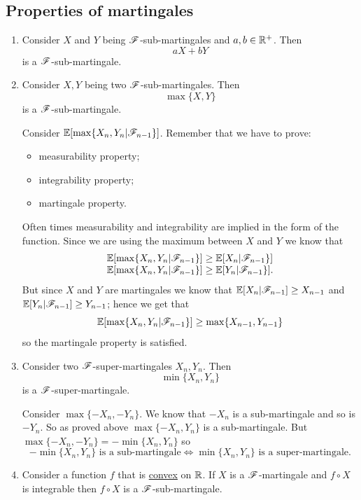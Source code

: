 \documentclass{report}
\begin{document}
\subsection{Properties of martingales}
\begin{enumerate}
	\item Consider $X$ and $Y$ being $\mathscr{F}$-sub-martingales and $a,b\in\mathbb{R}^{+}$. Then 
	\[aX+bY\]
	is a $\mathscr{F}$-sub-martingale.
	\item Consider $X,Y$ being two $\mathscr{F}$-sub-martingales. Then
	\[\max\{X,Y\}\]
	is a $\mathscr{F}$-sub-martingale.
	\begin{fancyproof}
		Consider $\mathbb{E}[\max\{X_{n},Y_{n}|\mathscr{F}_{n-1}\}]$. Remember that we have to prove: \begin{itemize}
			\item measurability property;
			\item integrability property;
			\item martingale property.
		\end{itemize}
		Often times measurability and integrability are implied in the form of the function.  Since we are using the maximum between $X$ and $Y$ we know that
		\[\begin{array}{l}
			\mathbb{E}[\max\{X_{n},Y_{n}|\mathscr{F}_{n-1}\}]\geq\mathbb{E}[X_{n}|\mathscr{F}_{n-1}\}]\\
			\mathbb{E}[\max\{X_{n},Y_{n}|\mathscr{F}_{n-1}\}]\geq\mathbb{E}[Y_{n}|\mathscr{F}_{n-1}\}].
		\end{array}\]
		But since $X$ and $Y$ are martingales we know that $\mathbb{E}[X_{n}|\mathscr{F}_{n-1}]\geq X_{n-1}$ and $\mathbb{E}[Y_{n}|\mathscr{F}_{n-1}]\geq Y_{n-1}$; hence we get that
		\[\mathbb{E}[\max\{X_{n},Y_{n}|\mathscr{F}_{n-1}\}]\geq\max\{X_{n-1},Y_{n-1}\}\]
		so the martingale property is satisfied.
	\end{fancyproof}
	\item Consider two $\mathscr{F}$-super-martingales $X_{n},Y_{n}$. Then
	\[\min\{X_{n},Y_{n}\}\]
	is a $\mathscr{F}$-super-martingale.
	\begin{fancyproof}
		Consider $\max\{-X_{n},-Y_{n}\}$. We know that $-X_n$ is a sub-martingale and so is $-Y_{n}$. So as proved above $\max\{-X_{n},Y_{n}\}$ is a sub-martingale. But $\max\{-X_{n},-Y_{n}\}=-\min\{X_{n},Y_{n}\}$ so
		\[-\min\{X_{n},Y_{n}\}\text{ is a sub-martingale}\iff\min\{X_{n},Y_{n}\}\text{ is a super-martingale}.\]
	\end{fancyproof}
	\item Consider a function $f$ that is \underline{convex} on $\mathbb{R}$. If $X$ is a $\mathscr{F}$-martingale and $f\circ X$ is integrable then $f\circ X$ is a $\mathscr{F}$-sub-martingale.
	\begin{fancyproof}

\end{fancyproof}
\end{enumerate}
\end{document}
